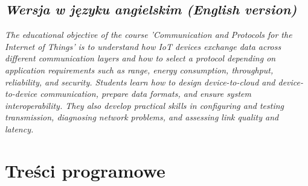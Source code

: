 \documentclass[12pt, a4paper]{article}
\begin{document}
\subsection*{\textit{Wersja w języku angielskim (English version)}}

\textit{The educational objective of the course 'Communication and Protocols for the Internet of Things' is to understand how IoT devices exchange data across different communication layers and how to select a protocol depending on application requirements such as range, energy consumption, throughput, reliability, and security. Students learn how to design device-to-cloud and device-to-device communication, prepare data formats, and ensure system interoperability. They also develop practical skills in configuring and testing transmission, diagnosing network problems, and assessing link quality and latency.}


\section{Treści programowe}
\end{document}
